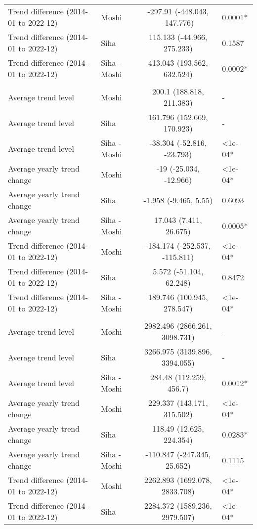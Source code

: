 \begin{longtable}{l|lcl}
Trend difference (2014-01 to 2022-12) & Moshi & -297.91 (-448.043, -147.776) & 0.0001* \\ 
Trend difference (2014-01 to 2022-12) & Siha & 115.133 (-44.966, 275.233) & 0.1587 \\ 
Trend difference (2014-01 to 2022-12) & Siha - Moshi & 413.043 (193.562, 632.524) & 0.0002* \\ 
\midrule\addlinespace[2.5pt]
\multicolumn{4}{l}{Respiratory Diseases} \\ 
\midrule\addlinespace[2.5pt]
Average trend level & Moshi & 200.1 (188.818, 211.383) & - \\ 
Average trend level & Siha & 161.796 (152.669, 170.923) & - \\ 
Average trend level & Siha - Moshi & -38.304 (-52.816, -23.793) & <1e-04* \\ 
Average yearly trend change & Moshi & -19 (-25.034, -12.966) & <1e-04* \\ 
Average yearly trend change & Siha & -1.958 (-9.465, 5.55) & 0.6093 \\ 
Average yearly trend change & Siha - Moshi & 17.043 (7.411, 26.675) & 0.0005* \\ 
Trend difference (2014-01 to 2022-12) & Moshi & -184.174 (-252.537, -115.811) & <1e-04* \\ 
Trend difference (2014-01 to 2022-12) & Siha & 5.572 (-51.104, 62.248) & 0.8472 \\ 
Trend difference (2014-01 to 2022-12) & Siha - Moshi & 189.746 (100.945, 278.547) & <1e-04* \\ 
\midrule\addlinespace[2.5pt]
\multicolumn{4}{l}{Respiratory Infections} \\ 
\midrule\addlinespace[2.5pt]
Average trend level & Moshi & 2982.496 (2866.261, 3098.731) & - \\ 
Average trend level & Siha & 3266.975 (3139.896, 3394.055) & - \\ 
Average trend level & Siha - Moshi & 284.48 (112.259, 456.7) & 0.0012* \\ 
Average yearly trend change & Moshi & 229.337 (143.171, 315.502) & <1e-04* \\ 
Average yearly trend change & Siha & 118.49 (12.625, 224.354) & 0.0283* \\ 
Average yearly trend change & Siha - Moshi & -110.847 (-247.345, 25.652) & 0.1115 \\ 
Trend difference (2014-01 to 2022-12) & Moshi & 2262.893 (1692.078, 2833.708) & <1e-04* \\ 
Trend difference (2014-01 to 2022-12) & Siha & 2284.372 (1589.236, 2979.507) & <1e-04* \\ 

\end{longtable}

